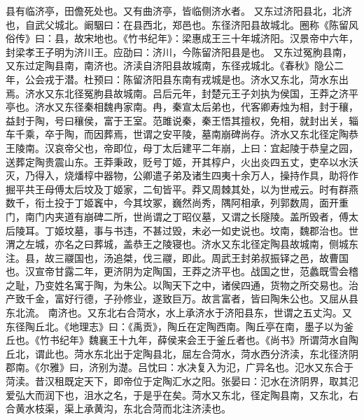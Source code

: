 \documentclass[12pt,UTF8]{ctexbook}
\begin{document}
县有临济亭，田儋死处也。又有曲济亭，皆临侧济水者。
又东过济阳县北，北济也，自武父城北。阚駰曰：在县西北，郑邑也。东径济阳县故城北。圈称《陈留风俗传》曰：县，故宋地也。《竹书纪年》：梁惠成王三十年城济阳。汉景帝中六年，封梁孝王子明为济川王。应劭曰：济川，今陈留济阳县是也。
又东过冤朐县南，又东过定陶县南，南济也。济渎自济阳县故城南，东径戎城北。《春秋》隐公二年，公会戎于潜。杜预曰：陈留济阳县东南有戎城是也。济水又东北，菏水东出焉。济水又东北径冤朐县故城南。吕后元年，封楚元王子刘执为侯国，王莽之济平亭也。济水又东径秦相魏冉家南。冉，秦宣太后弟也，代客卿寿烛为相，封于穰，益封于陶，号曰穰侯，富于王室。范雎说秦，秦王悟其擅权，免相，就封出关，辎车千乘，卒于陶，而因葬焉，世谓之安平陵，墓南崩碑尚存。济水又东北径定陶恭王陵南。汉哀帝父也，帝即位，母丁太后建平二年崩，上曰：宜起陵于恭皇之园，送葬定陶贵震山东。王莽秉政，贬号丁姬，开其椁户，火出炎四五丈，吏卒以水沃灭，乃得入，烧燔椁中器物，公卿遣子弟及诸生四夷十余万人，操持作具，助将作掘平共王母傅太后坟及丁姬家，二旬皆平。莽又周棘其处，以为世戒云。时有群燕数千，衔土投于丁姬竁中，今其坟冢，巍然尚秀，隅阿相承，列郭数周，面开重门，南门内夹道有崩碑二所，世尚谓之丁昭仪墓，又谓之长隧陵。盖所毁者，傅太后陵耳。丁姬坟墓，事与书违，不甚过毁，未必一如史说也。坟南，魏郡治也。世渭之左城，亦名之曰葬城，盖恭王之陵寝也。济水又东北径定陶县故城南，侧城东注。县，故三鬷国也，汤追桀，伐三鬷，即此。周武王封弟叔振铎之邑，故曹国也。汉宣帝甘露二年，更济阴为定陶国，王莽之济平也。战国之世，范蠡既雪会稽之耻，乃变姓名寓于陶，为朱公。以陶天下之中，诸侯四通，货物之所交易也。治产致千金，富好行德，子孙修业，遂致巨万。故言富者，皆曰陶朱公也。又屈从县东北流。
南济也。又东北右合菏水，水上承济水于济阳县东，世谓之五丈沟。又东径陶丘北。《地理志》曰：《禹贡》，陶丘在定陶西南。陶丘亭在南，墨子以为釜丘也。《竹书纪年》魏襄王十九年，薛侯来会王于釜丘者也。《尚书》所谓菏水自陶丘北，谓此也。菏水东北出于定陶县北，屈左合菏水，菏水西分济渎，东北径济阴郡南。《尔雅》曰，济别为濋。吕忱曰：水决复入为氾，广异名也。氾水又东合于菏渎。昔汉租既定天下，即帝位于定陶汇水之阳。张晏曰：氾水在济阴界，取其氾爱弘大而润下也，沮水之名，于是乎在矣。菏水又东北，径定陶县南，又东北，右合黄水枝渠，渠上承黄沟，东北合菏而北注济渎也。
\end{document}

